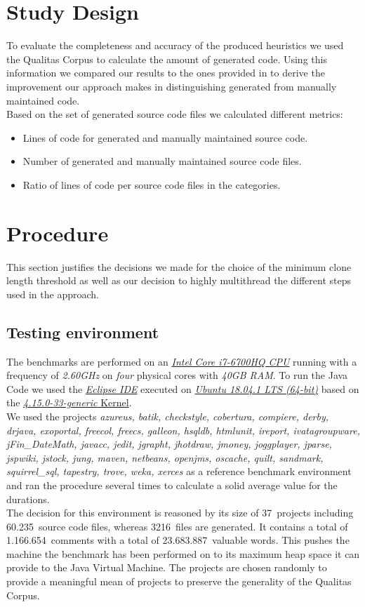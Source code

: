 \section{Study Design}
To evaluate the completeness and accuracy of the produced heuristics we used the Qualitas Corpus to calculate the amount of generated code. Using this information we compared our results to the ones provided in \cite{Bernwieser2014} to derive the improvement our approach makes in distinguishing generated from manually maintained code.\\
Based on the set of generated source code files we calculated different metrics:
\begin{itemize}
	\item Lines of code for generated and manually maintained source code.
	\item Number of generated and manually maintained source code files.
	\item Ratio of lines of code per source code files in the categories.
\end{itemize}

\section{Procedure}
This section justifies the decisions we made for the choice of the minimum clone length threshold as well as our decision to highly multithread the different steps used in the approach.

\subsection{Testing environment}
The benchmarks are performed on an \href{https://www.intel.de/}{\textit{Intel Core i7-6700HQ CPU}} running with a frequency of \textit{2.60GHz} on \textit{four} physical cores with \textit{40GB RAM}. To run the Java Code we used the \href{https://www.eclipse.org/}{\textit{Eclipse IDE}} executed on \href{https://www.ubuntu.com/}{\textit{Ubuntu 18.04.1 LTS (64-bit)}} based on the \href{https://www.ubuntu.com/}{\textit{4.15.0-33-generic} Kernel}.\\
We used the projects \textit{azureus, batik, checkstyle, cobertura, compiere, derby, drjava, exoportal, freecol, freecs, galleon, hsqldb, htmlunit, ireport, ivatagroupware, jFin\_DateMath, javacc, jedit, jgrapht, jhotdraw, jmoney, joggplayer, jparse, jspwiki, jstock, jung, maven, netbeans, openjms, oscache, quilt, sandmark, squirrel\_sql, tapestry, trove, weka, xerces} as a reference benchmark environment and ran the procedure several times to calculate a solid average value for the durations. \\
The decision for this environment is reasoned by its size of 37~projects including 60.235~source code files, whereas 3216~files are generated. It contains a total of 1.166.654~comments with a total of 23.683.887~valuable words. This pushes the machine the benchmark has been performed on to its maximum heap space it can provide to the Java Virtual Machine. The projects are chosen randomly to provide a meaningful mean of projects to preserve the generality of the Qualitas Corpus.

